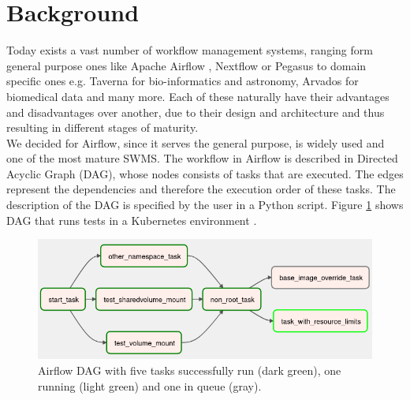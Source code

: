 \documentclass[lettersize,journal]{IEEEtran}
\begin{document}
\section{Background}
Today exists a vast number of workflow management systems, ranging form general purpose ones like Apache Airflow \cite{airflow}, Nextflow \cite{nextflow} or Pegasus \cite{pegasus} to domain specific ones e.g. Taverna \cite{taverna} for bio-informatics and astronomy, Arvados \cite{arvados} for biomedical data and many more. Each of these naturally have their advantages and disadvantages over another, due to their design and architecture and thus resulting in different stages of maturity.\\
We decided for Airflow, since it serves the general purpose, is widely used and one of the most mature SWMS. The workflow in Airflow is described in Directed Acyclic Graph (DAG), whose nodes consists of tasks that are executed. The edges represent the dependencies and therefore the execution order of these tasks. The description of the DAG is specified by the user in a Python script. Figure \ref{fig:aiflow:dag} shows DAG that runs tests in a Kubernetes environment \cite{airflowDag}.
\begin{figure}[h]
	\includegraphics[width=\linewidth]{images/airflow-dag.png}
	\caption{Airflow DAG with five tasks successfully run (dark green), one running (light green) and one in queue (gray).}
	\label{fig:aiflow:dag}
\end{figure}
\end{document}
